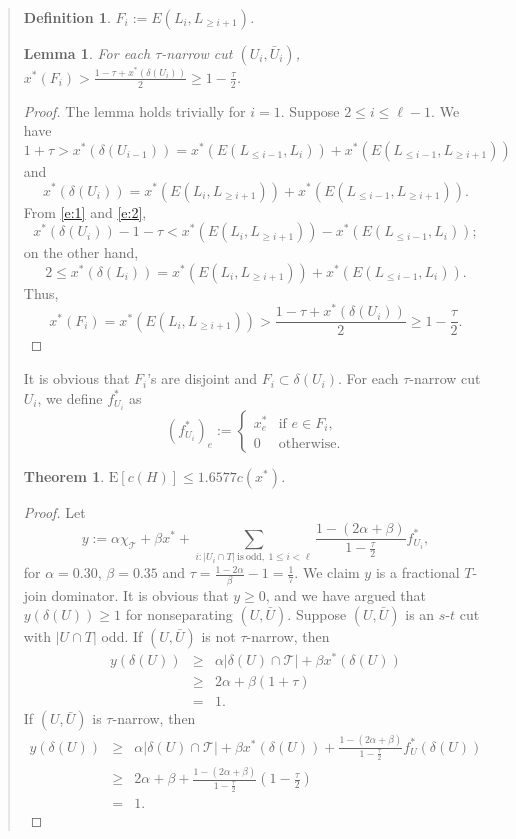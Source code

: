 \documentclass[11pt,letterpaper]{article}
\newtheorem{lemma}{Lemma}
\newtheorem{thm}{Theorem}
\newtheorem{defn}{Definition}
\newcommand{\E}{\mathrm{E}}
\newcommand{\st}{\mbox{$s$-$t$} }
\begin{document}
\begin{quote}
\begin{defn}
$F_i := E(L_i, L_{\geq i+1})$.
\end{defn}

\begin{lemma}\label{l:largedisjoint}
For each $\tau$-narrow cut $(U_i,\bar U_i)$, $x^*(F_i)>\frac{1-\tau+x^*(\delta(U_i))}{2} \geq 1-\frac{\tau}{2}$.
\end{lemma}
\begin{proof}
The lemma holds trivially for $i=1$. Suppose $2\leq i\leq \ell-1$. We have\begin{equation}
1+\tau > x^*(\delta(U_{i-1})) = x^*(E(L_{\leq i-1}, L_i)) + x^*(E(L_{\leq i-1}, L_{\geq i+1}))\label{e:1}
\end{equation}and\begin{equation}
x^*(\delta(U_i)) = x^*(E(L_i, L_{\geq i+1})) + x^*(E(L_{\leq i-1}, L_{\geq i+1}))\label{e:2}
.\end{equation}
From \eqref{e:1} and \eqref{e:2},\[
x^*(\delta(U_i))-1-\tau < x^*(E(L_i, L_{\geq i+1})) - x^*(E(L_{\leq i-1}, L_i))
;\]on the other hand,\[
2 \leq x^*(\delta(L_i)) = x^*(E(L_i, L_{\geq i+1})) + x^*(E(L_{\leq i-1}, L_i))
.\]Thus,\[
x^*(F_i) = x^*(E(L_i, L_{\geq i+1})) > \frac{1-\tau+x^*(\delta(U_i))}{2} \geq 1-\frac{\tau}{2}
.\]
\end{proof}

It is obvious that $F_i$'s are disjoint and $F_i\subset\delta(U_i)$. For each $\tau$-narrow cut $U_i$, we define $f^*_{U_i}$ as\[
(f^*_{U_i})_e :=\begin{cases}
x_e^*&\textrm{if }e\in F_i,\\
0&\textrm{otherwise}
.\end{cases}
\]

\begin{thm}\label{t:qi}
$\E[c(H)]\leq 1.6577 c(x^*)$.
\end{thm}
\begin{proof}
Let\[
y:=\alpha\chi_{\mathscr{T}}+\beta x^*+\sum_{i:|U_i \cap T|\mathrm{~is~odd,~}1\leq i<\ell} \frac{1-(2\alpha+\beta)}{1-\frac{\tau}{2}}f^*_{U_i}
,\]for $\alpha=0.30$, $\beta=0.35$ and $\tau=\frac{1-2\alpha}{\beta}-1=\frac{1}{7}$. We claim $y$ is a fractional $T$-join dominator. It is obvious that $y\geq 0$, and we have argued that $y(\delta(U))\geq 1$ for nonseparating $(U,\bar U)$. Suppose $(U,\bar U)$ is an \st cut with $|U\cap T|$ odd. If $(U,\bar U)$ is not $\tau$-narrow, then\begin{eqnarray*}
y(\delta(U)) &\geq& \alpha |\delta(U)\cap \mathscr{T}|+\beta x^*(\delta(U))\\
&\geq& 2\alpha + \beta(1+\tau)\\
&=&1
.\end{eqnarray*}If $(U,\bar U)$ is $\tau$-narrow, then\begin{eqnarray*}
y(\delta(U)) &\geq& \alpha |\delta(U)\cap \mathscr{T}|+\beta x^*(\delta(U)) + \frac{1-(2\alpha+\beta)}{1-\frac{\tau}{2}} f^*_U(\delta(U))\\
&\geq& 2\alpha + \beta + \frac{1-(2\alpha+\beta)}{1-\frac{\tau}{2}} \left(1-\frac{\tau}{2}\right)\\
&=&1
.\end{eqnarray*}


\end{proof}
\end{quote}
\end{document}

